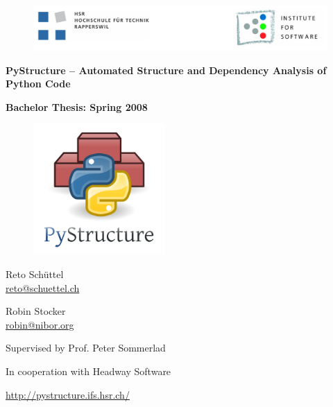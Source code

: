 \documentclass[12pt,halfparskip,DIV11,BCOR10mm]{scrreprt}
\begin{document}
\begin{titlepage}

\thispagestyle{empty}

\begin{center}

\begin{figure}[h]
 \centering
 \vspace{0,5cm}
 \includegraphics[width=\textwidth]{img/hsr_logo}
\end{figure}

\vspace{1cm}
{\Huge \bfseries PyStructure -- Automated Structure and Dependency Analysis of Python Code}

\vspace{0,4cm}
{\Large \bfseries Bachelor Thesis: Spring 2008}

\vspace{0,4cm}
\SVNDate{}

\vspace{0.4cm}
\begin{figure}[h]
 \centering
 \includegraphics[width=5cm]{img/pystructure}
\end{figure}

\vspace{0.4cm}
Reto Schüttel \\ \url{reto@schuettel.ch}

\vspace{0,3cm}
Robin Stocker \\ \url{robin@nibor.org}

\vspace{0,3cm}
Supervised by Prof. Peter Sommerlad

In cooperation with Headway Software

\vspace{0.8cm}
\url{http://pystructure.ifs.hsr.ch/}

\end{center}
\end{titlepage}
\end{document}
